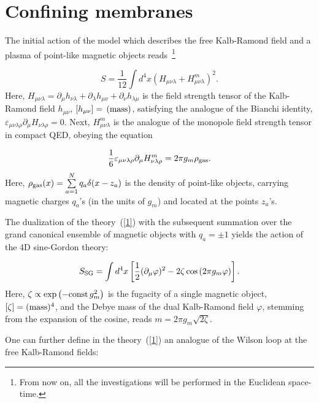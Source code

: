 \documentclass[a4paper,12pt]{article}
\begin{document}
\section{Confining membranes}

The initial action of 
the model which describes the free Kalb-Ramond field and a plasma of point-like magnetic objects 
reads~\footnote{From now on, all the investigations will be performed in the 
Euclidean space-time.}

\begin{equation}
\label{1}
S=\frac{1}{12}\int d^4x\left(H_{\mu\nu\lambda}+H_{\mu\nu\lambda}^m\right)^2.
\end{equation}
Here, $H_{\mu\nu\lambda}=\partial_\mu h_{\nu\lambda}+\partial_\lambda h_{\mu\nu}+
\partial_\nu h_{\lambda\mu}$ is the field strength tensor of the Kalb-Ramond field
$h_{\mu\nu}$, $\left[h_{\mu\nu}\right]={\,}({\rm mass})$, 
satisfying the analogue of the Bianchi identity, $\varepsilon_{\mu\nu\lambda\rho}\partial_\mu
H_{\nu\lambda\rho}=0$. Next, $H_{\mu\nu\lambda}^m$ is the analogue of the monopole field strength 
tensor in compact QED, obeying the equation 

\begin{equation}
\label{bi}
\frac16\varepsilon_{\mu\nu\lambda\rho}\partial_\mu
H_{\nu\lambda\rho}^m=2\pi g_m\rho_{\rm gas}. 
\end{equation}
Here, $\rho_{\rm gas}(x)=\sum\limits_{a=1}^{N}q_a\delta(x-z_a)$ is the density of point-like  
objects, carrying magnetic charges $q_a$'s (in the units of $g_m$) and located at the points $z_a$'s.

The dualization of the theory~(\ref{1}) with the subsequent summation over the grand canonical ensemble
of magnetic objects with $q_a=\pm 1$ yields the action of the 4D sine-Gordon theory:

\begin{equation}
\label{sg}
S_{\rm SG}=\int d^4x\left[\frac12(\partial_\mu\varphi)^2-2\zeta\cos\left(2\pi g_m\varphi\right)\right].
\end{equation}
Here, $\zeta\propto\exp\left(-{\rm const}{\,}g_m^2\right)$ is the fugacity of a single magnetic object, 
$[\zeta]=({\rm mass})^4$, 
and the Debye mass of the dual Kalb-Ramond field $\varphi$, stemming from the expansion of the cosine,
reads $m=2\pi g_m\sqrt{2\zeta}$. 

One can further define in the theory~(\ref{1}) 
an analogue of the Wilson loop at the free Kalb-Ramond fields:
\end{document}
